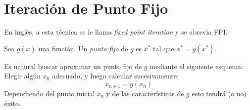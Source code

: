 \section{Iteración de Punto Fijo}

  En inglés,
  a esta técnica
  se le llama \emph{\foreignlanguage{english}{fixed point iteration}}
  y se abrevia FPI.
  \begin{definition}
    Sea \(g(x)\) una función.
    Un \emph{punto fijo} de \(g\)
    es \(x^*\) tal que \(x^* = g(x^*)\).
  \end{definition}
  Es natural buscar aproximar un punto fijo de \(g\)
  mediante el siguiente esquema:
  Elegir algún \(x_0\) adecuado,
  y luego calcular sucesivamente:
  \begin{equation*}
    x_{n + 1}
      = g(x_n)
  \end{equation*}
  Dependiendo del punto inicial \(x_0\) y de las características de \(g\)
  esto tendrá
  (o no)
  éxito.

